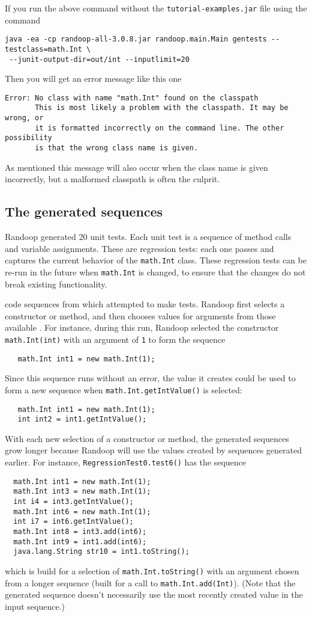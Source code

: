 \documentclass[11pt, oneside]{article} %
\newcommand{\code}[1]{{\texttt{#1}}}
\begin{document}
If you run the above command without the \texttt{tutorial-examples.jar} file using the command
\begin{verbatim}
java -ea -cp randoop-all-3.0.8.jar randoop.main.Main gentests --testclass=math.Int \
 --junit-output-dir=out/int --inputlimit=20
\end{verbatim}
Then you will get an error message like this one
\begin{verbatim}
Error: No class with name "math.Int" found on the classpath
       This is most likely a problem with the classpath. It may be wrong, or
       it is formatted incorrectly on the command line. The other possibility
       is that the wrong class name is given.
\end{verbatim}
As mentioned this message will also occur when the class name is given incorrectly, but a malformed classpath is often the culprit.


\subsection{The generated sequences}
Randoop generated 20 unit tests.  Each unit test is a sequence of method
calls and variable assignments.  These are regression tests:  each one
passes and captures the current behavior of the \code{math.Int} class.
These regression tests can be re-run in the future when \code{math.Int} is
changed, to ensure that the changes do not break existing functionality.

 code sequences from which attempted to make tests. 
Randoop first selects a constructor or method, and then chooses values for arguments from those available .
For instance, during this run, Randoop selected the constructor \code{math.Int(int)} with an argument of \code{1} to form the sequence
\begin{verbatim}
   math.Int int1 = new math.Int(1);
\end{verbatim}
Since this sequence runs without an error, the value it creates could be used to form a new sequence when \code{math.Int.getIntValue()} is selected:
\begin{verbatim}
   math.Int int1 = new math.Int(1);
   int int2 = int1.getIntValue();
\end{verbatim}
With each new selection of a constructor or method, the generated sequences grow longer because Randoop will use the values created by sequences generated earlier. 
For instance, \code{RegressionTest0.test6()} has the sequence
\begin{verbatim}
  math.Int int1 = new math.Int(1);
  math.Int int3 = new math.Int(1);
  int i4 = int3.getIntValue();
  math.Int int6 = new math.Int(1);
  int i7 = int6.getIntValue();
  math.Int int8 = int3.add(int6);
  math.Int int9 = int1.add(int6);
  java.lang.String str10 = int1.toString();
\end{verbatim}
which is build for a selection of \code{math.Int.toString()} with an argument chosen from a longer sequence (built for a call to \code{math.Int.add(Int)}).
(Note that the generated sequence doesn't necessarily use the most recently created value in the input sequence.)
\end{document}
